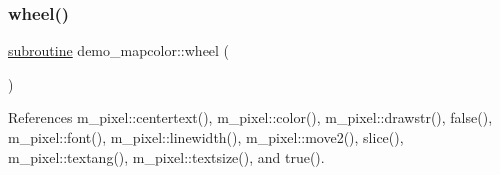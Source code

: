 \mbox{\label{huegif_8f90_afc37db6c42d2e7bb12cb85b98d9eba9b}} 
\subsubsection{\texorpdfstring{wheel()}{wheel()}}
{\footnotesize\ttfamily \hyperlink{M__stopwatch_83_8txt_acfbcff50169d691ff02d4a123ed70482}{subroutine} demo\+\_\+mapcolor\+::wheel (\begin{DoxyParamCaption}{ }\end{DoxyParamCaption})}



References m\+\_\+pixel\+::centertext(), m\+\_\+pixel\+::color(), m\+\_\+pixel\+::drawstr(), false(), m\+\_\+pixel\+::font(), m\+\_\+pixel\+::linewidth(), m\+\_\+pixel\+::move2(), slice(), m\+\_\+pixel\+::textang(), m\+\_\+pixel\+::textsize(), and true().

